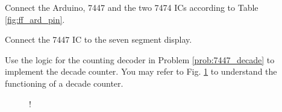 \begin{problem}
Connect the Arduino, 7447 and the two 7474 ICs according to Table \ref{fig:ff_ard_pin}.
\end{problem}
%
\begin{problem}
Connect the 7447 IC to the seven segment display.
\end{problem}
\begin{problem}
Use the logic for the counting decoder in Problem \ref{prob:7447_decade} to implement the decade counter. You may refer to Fig. \ref{fig:decade_counter} to understand the
functioning of a decade counter.

\end{problem}
%
%
\begin{figure}[!h]
\begin{center}
\resizebox {\columnwidth} {!} {

}
\end{center}
\caption{}
\label{fig:decade_counter}
\end{figure}
%




